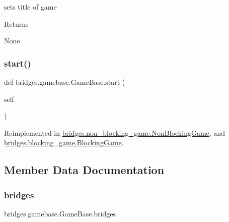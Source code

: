 sets title of game 

\begin{DoxyReturn}{Returns}


None 
\end{DoxyReturn}
\mbox{\label{classbridges_1_1gamebase_1_1_game_base_a05a30fccf88c2baba1137b5a06ba2ed7}} 
\subsubsection{\texorpdfstring{start()}{start()}}
{\footnotesize\ttfamily def bridges.\+gamebase.\+Game\+Base.\+start (\begin{DoxyParamCaption}\item[{}]{self }\end{DoxyParamCaption})}



Reimplemented in \mbox{\hyperlink{classbridges_1_1non__blocking__game_1_1_non_blocking_game_ad6e23c265e1b710114459f0b666d25cb}{bridges.\+non\+\_\+blocking\+\_\+game.\+Non\+Blocking\+Game}}, and \mbox{\hyperlink{classbridges_1_1blocking__game_1_1_blocking_game_ab7a2a5d6d83b2e72800ddffa3c0ad818}{bridges.\+blocking\+\_\+game.\+Blocking\+Game}}.



\subsection{Member Data Documentation}
\mbox{\label{classbridges_1_1gamebase_1_1_game_base_a2310e51f398c089ca945b3af38c09231}} 
\subsubsection{\texorpdfstring{bridges}{bridges}}
{\footnotesize\ttfamily bridges.\+gamebase.\+Game\+Base.\+bridges}

\mbox{\label{classbridges_1_1gamebase_1_1_game_base_a25e8f6f349f54300666127f58669356c}} 
